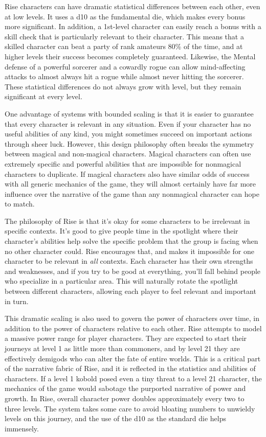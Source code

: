         Rise characters can have dramatic statistical differences between each other, even at low levels.
        It uses a d10 as the fundamental die, which makes every bonus more significant.
        In addition, a 1st-level character can easily reach a  bonus with a skill check that is particularly relevant to their character.
        This means that a skilled character can beat a party of rank amateurs 80\% of the time, and at higher levels their success becomes completely guaranteed.
        Likewise, the Mental defense of a powerful sorcerer and a cowardly rogue can allow mind-affecting attacks to almost always hit a rogue while almost never hitting the sorcerer.
        These statistical differences do not always grow with level, but they remain significant at every level.

        One advantage of systems with bounded scaling is that it is easier to guarantee that every character is relevant in any situation.
        Even if your character has no useful abilities of any kind, you might sometimes succeed on important actions through sheer luck.
        However, this design philosophy often breaks the symmetry between magical and non-magical characters.
        Magical characters can often use extremely specific and powerful abilities that are impossible for nonmagical characters to duplicate.
        If magical characters also have similar odds of success with all generic mechanics of the game, they will almost certainly have far more influence over the narrative of the game than any nonmagical character can hope to match.

        The philosophy of Rise is that it's okay for some characters to be irrelevant in specific contexts.
        It's good to give people time in the spotlight where their character's abilities help solve the specific problem that the group is facing when no other character could.
        Rise encourages that, and makes it impossible for one character to be relevant in \textit{all} contexts.
        Each character has their own strengths and weaknesses, and if you try to be good at everything, you'll fall behind people who specialize in a particular area.
        This will naturally rotate the spotlight between different characters, allowing each player to feel relevant and important in turn.

        This dramatic scaling is also used to govern the power of characters over time, in addition to the power of characters relative to each other.
        Rise attempts to model a massive power range for player characters.
        They are expected to start their journeys at level 1 as little more than commoners, and by level 21 they are effectively demigods who can alter the fate of entire worlds.
        This is a critical part of the narrative fabric of Rise, and it is reflected in the statistics and abilities of characters.
        If a level 1 kobold posed even a tiny threat to a level 21 character, the mechanics of the game would sabotage the purported narrative of power and growth.
        In Rise, overall character power doubles approximately every two to three levels.
        The system takes some care to avoid bloating numbers to unwieldy levels on this journey, and the use of the d10 as the standard die helps immensely.

